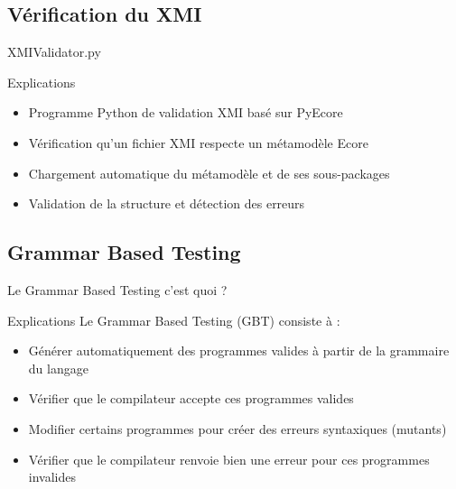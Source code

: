 
\subsection{Vérification du XMI}
\begin{frame}{XMIValidator.py}
    \begin{block}{Explications}
        \begin{itemize}
            \item Programme Python de validation XMI basé sur PyEcore
            \item Vérification qu’un fichier XMI respecte un métamodèle Ecore
            \item Chargement automatique du métamodèle et de ses sous-packages
            \item Validation de la structure et détection des erreurs
        \end{itemize}
    \end{block}
\end{frame}
\subsection{Grammar Based Testing}

\begin{frame}{Le Grammar Based Testing c'est quoi ?}
    \begin{block}{Explications}
     Le Grammar Based Testing (GBT) consiste à :
        \begin{itemize}
            \item Générer automatiquement des programmes valides à partir de la grammaire du langage
            \item Vérifier que le compilateur accepte ces programmes valides
            \item Modifier certains programmes pour créer des erreurs syntaxiques (mutants)
            \item Vérifier que le compilateur renvoie bien une erreur pour ces programmes invalides
        \end{itemize}
    \end{block}
\end{frame}

